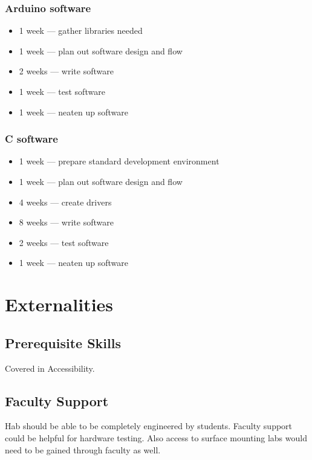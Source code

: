 \documentclass[conference]{IEEEtran} %
\begin{document}
\subsubsection*{Arduino software}
\begin{itemize}
    \item 1 week --- gather libraries needed
    \item 1 week --- plan out software design and flow
    \item 2 weeks --- write software
    \item 1 week --- test software
    \item 1 week --- neaten up software
\end{itemize}

\subsubsection*{C software}
\begin{itemize}
    \item 1 week --- prepare standard development environment
    \item 1 week --- plan out software design and flow
    \item 4 weeks --- create drivers
    \item 8 weeks --- write software
    \item 2 weeks --- test software
    \item 1 week --- neaten up software
\end{itemize}
\section{Externalities}
\subsection{Prerequisite Skills}

Covered in Accessibility.
\subsection{Faculty Support}
\textmu{}Hab should be able to be completely engineered by students. Faculty
support could be helpful for hardware testing. Also access to surface mounting
labs would need to be gained through faculty as well.
\end{document}
